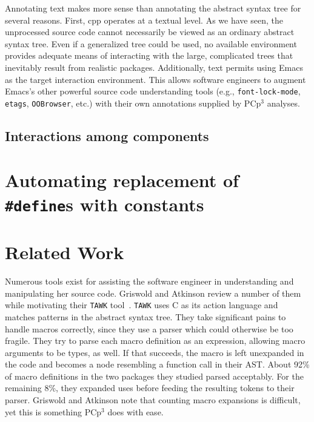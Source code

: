 \documentclass{article}
\newcommand{\pcp}{\mbox{\textsf{PCp}$^3$}}
\newcommand{\Cpp}{\mbox{\textsf{cpp}}}
\newcommand{\C}{\mbox{\textsf{C}}}
\newcommand{\ppd}[1]{\texttt{\##1}}
\newcommand{\eg}{e.g.,}
\newcommand{\etc}{etc}  %
\begin{document}
Annotating text makes more sense than annotating the abstract syntax
tree for several reasons.  First, \Cpp{} operates at a textual level.
As we have seen, the unprocessed source code cannot necessarily be
viewed as an ordinary abstract syntax tree.  Even if a generalized tree
could be used, no available environment provides adequate means of
interacting with the large, complicated trees that inevitably result
from realistic packages.  Additionally, text permits using Emacs as the
target interaction environment. This allows software engineers to
augment Emacs's other powerful source code understanding tools (\eg{}
\texttt{font-lock-mode}, \texttt{etags}, \texttt{OOBrowser}, \etc{}.)
with their own annotations supplied by \pcp{} analyses.


\subsection{Interactions among components}



\section{Automating replacement of \ppd{define}s with constants}
\label{sec:xform}




\section{Related Work}
\label{sec:related}
Numerous tools exist for assisting the software engineer in
understanding and manipulating her source code.  Griswold and Atkinson
review a number of them while motivating their \texttt{TAWK} tool~\cite{Griswold96}.
\texttt{TAWK} uses \C{} as its action language and matches patterns in
the abstract syntax tree.  They take significant pains to handle macros
correctly, since they use a parser which could otherwise be too
fragile.  They try to parse each macro definition as an expression,
allowing macro arguments to be types, as well.  If that succeeds, the
macro is left unexpanded in the code and becomes a node resembling a
function call in their AST.  About 92\% of macro definitions in the two packages
they studied parsed acceptably.  For the remaining 8\%, they expanded
uses before feeding the resulting tokens to their parser.  Griswold and
Atkinson note that counting macro expansions is difficult, yet this is
something \pcp{} does with ease.
\end{document}
